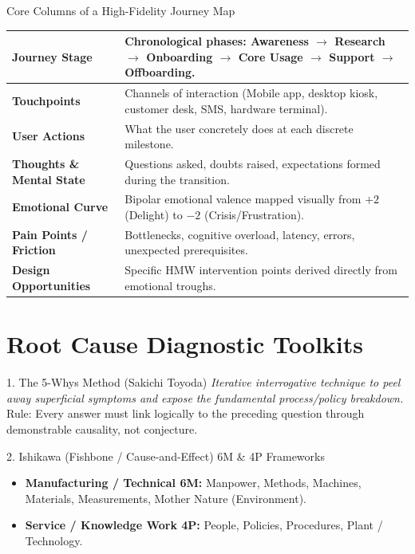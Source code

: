 \begin{canvasbox}{Core Columns of a High-Fidelity Journey Map}
\begin{tabularx}{\linewidth}{|l|X|} \hline
\textbf{Journey Stage} & Chronological phases: Awareness $\to$ Research $\to$ Onboarding $\to$ Core Usage $\to$ Support $\to$ Offboarding. \\ \hline
\textbf{Touchpoints} & Channels of interaction (Mobile app, desktop kiosk, customer desk, SMS, hardware terminal). \\ \hline
\textbf{User Actions} & What the user concretely does at each discrete milestone. \\ \hline
\textbf{Thoughts \& Mental State} & Questions asked, doubts raised, expectations formed during the transition. \\ \hline
\textbf{Emotional Curve} & Bipolar emotional valence mapped visually from $+2$ (Delight) to $-2$ (Crisis/Frustration). \\ \hline
\textbf{Pain Points / Friction} & Bottlenecks, cognitive overload, latency, errors, unexpected prerequisites. \\ \hline
\textbf{Design Opportunities} & Specific HMW intervention points derived directly from emotional troughs. \\ \hline
\end{tabularx}
\end{canvasbox}

\section{Root Cause Diagnostic Toolkits}

\begin{frameworkbox}{1. The 5-Whys Method (Sakichi Toyoda)}
\textit{Iterative interrogative technique to peel away superficial symptoms and expose the fundamental process/policy breakdown.}\\
Rule: Every answer must link logically to the preceding question through demonstrable causality, not conjecture.
\end{frameworkbox}

\begin{frameworkbox}{2. Ishikawa (Fishbone / Cause-and-Effect) 6M \& 4P Frameworks}
\begin{itemize}
    \item \textbf{Manufacturing / Technical 6M:} Manpower, Methods, Machines, Materials, Measurements, Mother Nature (Environment).
    \item \textbf{Service / Knowledge Work 4P:} People, Policies, Procedures, Plant / Technology.
\end{itemize}
\end{frameworkbox}

